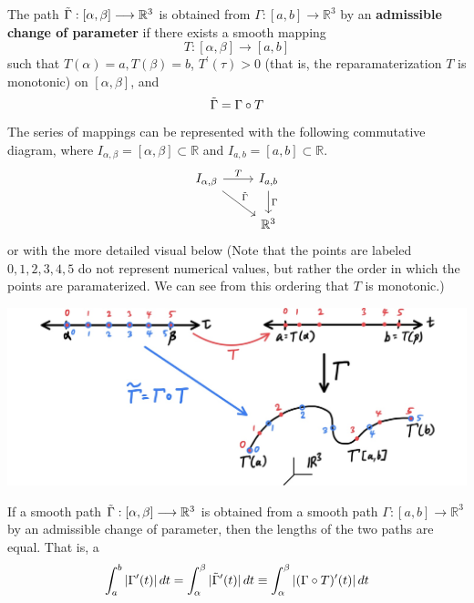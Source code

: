     \begin{definition}
      The path $\Tilde{\Gamma}: [\alpha, \beta] \longrightarrow \mathbb{R}^3$ is obtained from $\Gamma: [a, b] \longrightarrow \mathbb{R}^3$ by an \textbf{admissible change of parameter} if there exists a smooth mapping 
      \[T: [\alpha, \beta] \longrightarrow [a, b]\]
      such that $T(\alpha) = a, T(\beta) = b$, $T^\prime (\tau) > 0$ (that is, the reparamaterization $T$ is monotonic) on $[\alpha, \beta]$, and 
      \[\Tilde{\Gamma} = \Gamma \circ T\]
      The series of mappings can be represented with the following commutative diagram, where $I_{\alpha, \beta} = [\alpha, \beta] \subset \mathbb{R}$ and $I_{a, b} = [a, b] \subset \mathbb{R}$. 
      \[
        \begin{tikzcd}
          I_{\alpha, \beta} \arrow{r}{T} \arrow{rd}{\Tilde{\Gamma}}& I_{a, b} \arrow{d}{\Gamma}\\
           & \mathbb{R}^3
        \end{tikzcd}
      \]
      or with the more detailed visual below (Note that the points are labeled $0, 1, 2, 3, 4, 5$ do not represent numerical values, but rather the order in which the points are paramaterized. We can see from this ordering that $T$ is monotonic.)
      \begin{center}
          \includegraphics[scale=0.25]{img/Admissible_Change_of_Parameter.jpg}
      \end{center}
    \end{definition}

    \begin{theorem}
    If a smooth path $\Tilde{\Gamma}: [\alpha, \beta] \longrightarrow \mathbb{R}^3$ is obtained from a smooth path $\Gamma: [a, b] \longrightarrow \mathbb{R}^3$ by an admissible change of parameter, then the lengths of the two paths are equal. That is, a
    \[\int_a^b |\Gamma^\prime (t) |\,dt = \int_\alpha^\beta |\Tilde{\Gamma}^\prime (t)|\,dt \equiv \int_\alpha^\beta |(\Gamma \circ T)^\prime (t)|\,dt\]
    \end{theorem}

